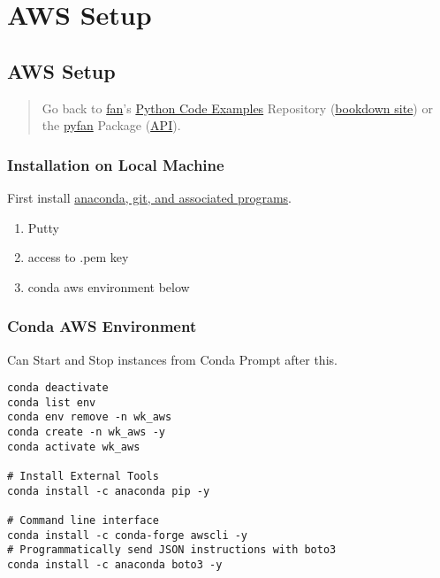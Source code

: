 \documentclass[
]{book}
\providecommand{\tightlist}{%
  \setlength{\itemsep}{0pt}\setlength{\parskip}{0pt}}
\begin{document}
\hypertarget{aws-setup}{%
\section{AWS Setup}\label{aws-setup}}

\hypertarget{aws-setup-1}{%
\subsection{AWS Setup}\label{aws-setup-1}}

\begin{quote}
Go back to \href{http://fanwangecon.github.io/}{fan}'s \href{https://fanwangecon.github.io/Py4Econ/}{Python Code Examples} Repository (\href{https://fanwangecon.github.io/Py4Econ/bookdown}{bookdown site}) or the \href{https://pyfan.readthedocs.io/en/latest/}{pyfan} Package (\href{https://pyfan.readthedocs.io/en/latest/reference.html}{API}).
\end{quote}

\hypertarget{installation-on-local-machine}{%
\subsubsection{Installation on Local Machine}\label{installation-on-local-machine}}

First install \href{https://fanwangecon.github.io/Tex4Econ/nontex/install/windows/fn_installations.html}{anaconda, git, and associated programs}.

\begin{enumerate}
\def\labelenumi{\arabic{enumi}.}
\tightlist
\item
  Putty
\item
  access to .pem key
\item
  conda aws environment below
\end{enumerate}

\hypertarget{conda-aws-environment}{%
\subsubsection{Conda AWS Environment}\label{conda-aws-environment}}

Can Start and Stop instances from Conda Prompt after this.

\begin{verbatim}
conda deactivate
conda list env
conda env remove -n wk_aws
conda create -n wk_aws -y
conda activate wk_aws

# Install External Tools
conda install -c anaconda pip -y

# Command line interface
conda install -c conda-forge awscli -y
# Programmatically send JSON instructions with boto3
conda install -c anaconda boto3 -y
\end{verbatim}
\end{document}
